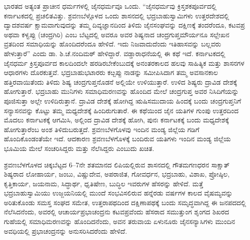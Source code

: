ಭಾರತದ ಅತ್ಯಂತ ಪ್ರಾಚೀನ ಧರ್ಮಗಳಲ್ಲಿ ಜೈನಧರ್ಮವೂ ಒಂದು. “ಜೈನಧರ್ಮವು ಕ್ರಿಸ್ತಶಕಪೂರ್ವದಲ್ಲಿ ಕರ್ನಾಟಕದಲ್ಲಿ ಪ್ರಚಲಿತವಿತ್ತು. ಶ್ರವಣಬೆಳ್ಗೊಳದ ಒಂದು ಶಾಸನದಲ್ಲಿ ಭದ್ರಬಾಹುಸ್ವಾಮಿಗಳು ಉತ್ತರದೇಶದಲ್ಲಿ ದ್ವಾದಶವರ್ಷ ಕ್ಷಾಮವಾಗುವುದನ್ನು ತಮ್ಮ ದಿವ್ಯಜ್ಞಾನದಿಂದ ತಿಳಿದು ಜೈನಸಂಘವನ್ನು ದಕ್ಷಿಣಕ್ಕೆ ತಂದರೆಂದೂ, ಕಟವಪ್ರ ಅಥವಾ ಕಳ್ವಪ್ಪು (ಚಂದ್ರಗಿರಿ) ಎಂಬ ಬೆಟ್ಟದಲ್ಲಿ ಅವರೂ ಅವರ ಶಿಷ್ಯನಾದ ಚಂದ್ರಗುಪ್ತಮೌರ್ಯನೂ ಸಲ್ಲೇಖನ ವ್ರತದಿಂದ ಸಮಾಧಿಯನ್ನು ಹೊಂದಿದರೆಂದೂ ಹೇಳಿದೆ. ಇದು ನಿಜವಾದುದೆಂದು ಇತಿಹಾಸವನ್ನು ಬಲ್ಲವರು ಹೇಳುತ್ತಾರೆ” ಎಂದು ಡಾ. ಶಿ.ಚೆ.ನಂದಿಮಠ್​ ಹೇಳಿದ್ದಾರೆ. ವಡ್ಡಾರಾಧನೆಯಲ್ಲಿ ಈ ಕಥೆ ಇದೆ. ಕರ್ನಾಟಕದಲ್ಲಿ ಜೈನಧರ್ಮ ಕ್ರಿಸ್ತಪೂರ್ವದ ಕಾಲದಿಂದಲೇ ಹರಡಿರಬೇಕೆಂಬುದಕ್ಕೆ ಅನಂತರಕಾಲದ ಹಲವು ಸಾಹಿತ್ಯಿಕ ಮತ್ತು ಶಾಸನಗಳ ಆಧಾರಗಳು ದೊರಕುತ್ತವೆ. ಭದ್ರಬಾಹುಭಟಾರರು ಕೞ್ಬಪ್ಪು ನಾಡನ್ನು ಸಮೀಪಿಸಿದಾಗ ತಮ್ಮ ಅವಸಾನಕಾಲ ಹತ್ತಿರವಾಯಿತೆಂದು ತಿಳಿದು ಶಿಷ್ಯ ಚಂದ್ರಗುಪ್ತನೊಡನೆ ಅಲ್ಲಿಯೇ ಉಳಿಯುತ್ತಾರೆ. ಉಳಿದ ಶಿಷ್ಯರು ದ್ರಾವಿಡ ದೇಶಕ್ಕೆ ಹೋಗುತ್ತಾರೆ. ಭದ್ರಬಾಹು ಮುನಿಗಳು ಸಮಾಧಿಮರಣವನ್ನು ಹೊಂದಿದ ಮೇಲೆ ಚಂದ್ರಗುಪ್ತ ಅವರ ನಿಸಿದಿಗೆಯನ್ನು ಪೂಜಿಸುತ್ತಾ ಅಲ್ಲೇ ಉಳಿದಿರುತ್ತಾನೆ. ದ್ರಾವಿಡ ದೇಶಕ್ಕೆ ಹೋಗಿದ್ದ ಋಷಿಸಮುದಾಯ ಹಿಂದಕ್ಕೆ ಬಂದು ಚಂದ್ರಗುಪ್ತನಿಗೆ ಸನ್ಯಾಸನವನ್ನು ಕೊಟ್ಟು ತಮ್ಮ ಮಧ್ಯದೇಶಕ್ಕೆ ಹಿಂದಿರುಗುತಾರೆ. ಈ ಕಥೆಯಿಂದ ಜೈನ ಯತಿಗಳ ಗುಂಪು ಉತ್ತರದಿಂದ ಮೊದಲು ಕರ್ನಾಟಕಕ್ಕೆ ಆಗಮಿಸಿ, ಅಲ್ಲಿಂದ ದ್ರಾವಿಡ ದೇಶಕ್ಕೆ ಹೋಗಿ, ಪುನಃ ಕರ್ನಾಟಕಕ್ಕೆ ಬಂದು ಮಧ್ಯದೇಶಕ್ಕೆ ಹೋಗುತ್ತಾರೆಂಬ ಅಂಶ ತಿಳಿದುಬರುತ್ತದೆ. ಶ್ರವಣಬೆಳಗೊಳವು ಇಂದಿನ ಮಂಡ್ಯ ಜಿಲ್ಲೆಯ ಗಡಿಗೆ ಹೊಂದಿಕೊಂಡಂತೆಯೇ ಇದೆ. ಆದಕಾರಣ ಶ್ರವಣಬೆಳಗೊಳಕ್ಕೆ ಬಂದಿರುವ ಯತಿಗಳು ಇಂದಿನ ಮಂಡ್ಯ ಜಿಲ್ಲೆಯ ಭೂಮಿಯ ಮೇಲೆ ಸಂಚರಿಸಿದ್ದರು ಮತ್ತು ನೆಲೆಸಿದ್ದರು ಎಂಬುದು ಖಚಿತ.

ಶ್ರವಣಬೆಳಗೊಳದ ಚಿಕ್ಕಬೆಟ್ಟದ 6–7ನೇ ಶತಮಾನದ ಲಿಪಿಯಲ್ಲಿರುವ ಶಾಸನದಲ್ಲಿ ಗೌತಮಗಣಧರನ ಸಾಕ್ಷಾತ್​ ಶಿಷ್ಯರಾದ ಲೋಹಾರ್ಯ, ಜಂಬು, ವಿಷ್ಣುದೇವ, ಅಪರಾಜಿತ, ಗೋವರ್ಧನ, ಭದ್ರಬಾಹು, ವಿಶಾಖ, ಪ್ರೋಷ್ಠಿಲ, ಕೃತ್ತಿಕಾರ್ಯ, ಜಯನಾಮ, ಸಿದ್ಧಾರ್ಥ, ಧೃತಿಷೇಣ, ಬುದ್ಧಿಲ ಇವರುಗಳ ಹೆಸರನ್ನು ಹೇಳಿದೆ. ಮತ್ತೆ ಭದ್ರಬಾಹುಸ್ವಾಮಿಯು ಉಜ್ಜಯನಿಯಲ್ಲಿ ಮುಂದೆ ಸಂಭವಿಸಲಿರುವ ಹನ್ನೆರಡು ವರ್ಷಗಳ ಕಾಲದ ವೈಷಮ್ಯವನ್ನು ಅರಿತುಕೊಂಡು ಸಮಸ್ತ ಸಂಘದ ಸಮೇತ, ಉತ್ತರಾಪಥದಿಂದ ದಕ್ಷಿಣಾಪಥಕ್ಕೆ ಬಂದು ಸಮೃದ್ಧವಾಗಿದ್ದ ಈ ಜನಪದದಲ್ಲಿ ನೆಲೆಸಿದನೆಂದು, ಅವರಲ್ಲಿ ಆಚಾರ್ಯಪ್ರಭಾಚಂದ್ರನು ಕಟವಪ್ರವೆಂದು ಹೆಸರಾದ ಸಮುತ್ತುಂಗ ಶೃಂಗದ ಶಿಖರದ ಗುಹೆಯಲ್ಲಿ ಸಮಾಧಿಮರಣವನ್ನು ಹೊಂದಿದನೆಂದು, ಅವನ ತರುವಾಯ ಏಳುನೂರು ಜೈನಸನ್ಯಾಸಿಗಳು ಮುಂದಿನ ಅವಧಿಯಲ್ಲಿ ಪ್ರಭಾಚಂದ್ರನನ್ನು ಅನುಸರಿಸಿದರೆಂದು ಹೇಳಿದೆ.

